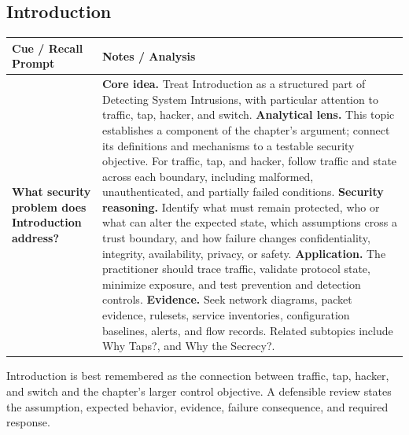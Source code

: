 \documentclass[11pt]{article}
\newcommand{\CornellHeader}{%
\rowcolor{Navy}\color{white}\bfseries Cue / Recall Prompt & \color{white}\bfseries Notes / Analysis\\\hline}
\newcommand{\CornellRow}[2]{%
\cellcolor{CueGray}\RaggedRight\textbf{#1} & \RaggedRight #2\\\hline}
\begin{document}
\subsection*{Introduction}
\begin{longtable}{>{\RaggedRight\arraybackslash}p{}|>{\RaggedRight\arraybackslash}p{}}
\CornellHeader
\CornellRow{What security problem does Introduction address?}{\textbf{Core idea.} Treat Introduction as a structured part of Detecting System Intrusions, with particular attention to traffic, tap, hacker, and switch. \textbf{Analytical lens.} This topic establishes a component of the chapter's argument; connect its definitions and mechanisms to a testable security objective. For traffic, tap, and hacker, follow traffic and state across each boundary, including malformed, unauthenticated, and partially failed conditions. \textbf{Security reasoning.} Identify what must remain protected, who or what can alter the expected state, which assumptions cross a trust boundary, and how failure changes confidentiality, integrity, availability, privacy, or safety. \textbf{Application.} The practitioner should trace traffic, validate protocol state, minimize exposure, and test prevention and detection controls. \textbf{Evidence.} Seek network diagrams, packet evidence, rulesets, service inventories, configuration baselines, alerts, and flow records. Related subtopics include Why Taps?, and Why the Secrecy?.}
\end{longtable}
\begin{topicsummary}
Introduction is best remembered as the connection between traffic, tap, hacker, and switch and the chapter's larger control objective. A defensible review states the assumption, expected behavior, evidence, failure consequence, and required response.
\end{topicsummary}
\end{document}
